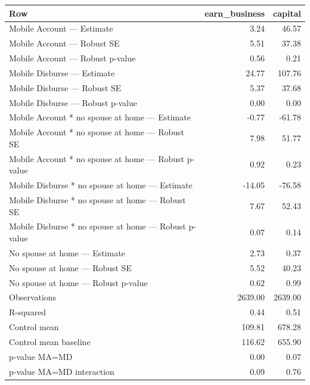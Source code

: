 
\begin{tabular}{lrr}
\toprule
Row & earn\_business & capital\\
\midrule
Mobile Account — Estimate & 3.24 & 46.57\\
Mobile Account — Robust SE & 5.51 & 37.38\\
Mobile Account — Robust p-value & 0.56 & 0.21\\
Mobile Disburse — Estimate & 24.77 & 107.76\\
Mobile Disburse — Robust SE & 5.37 & 37.68\\
\addlinespace
Mobile Disburse — Robust p-value & 0.00 & 0.00\\
Mobile Account * no spouse at home — Estimate & -0.77 & -61.78\\
Mobile Account * no spouse at home — Robust SE & 7.98 & 51.77\\
Mobile Account * no spouse at home — Robust p-value & 0.92 & 0.23\\
Mobile Disburse * no spouse at home — Estimate & -14.05 & -76.58\\
\addlinespace
Mobile Disburse * no spouse at home — Robust SE & 7.67 & 52.43\\
Mobile Disburse * no spouse at home — Robust p-value & 0.07 & 0.14\\
No spouse at home — Estimate & 2.73 & 0.37\\
No spouse at home — Robust SE & 5.52 & 40.23\\
No spouse at home — Robust p-value & 0.62 & 0.99\\
\addlinespace
Observations & 2639.00 & 2639.00\\
R-squared & 0.44 & 0.51\\
Control mean & 109.81 & 678.28\\
Control mean baseline & 116.62 & 655.90\\
p-value MA=MD & 0.00 & 0.07\\
\addlinespace
p-value MA=MD interaction & 0.09 & 0.76\\
\bottomrule
\end{tabular}
